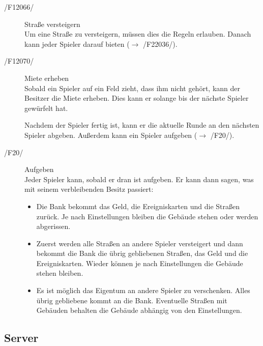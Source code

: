 \documentclass[a4paper,10pt]{article}
\begin{document}
\begin{description}
\item[/F12066/] Straße versteigern \\
Um eine Straße zu versteigern, müssen dies die Regeln erlauben. Danach kann jeder Spieler darauf bieten ($\rightarrow$ /F22036/).
\item[/F12070/] Miete erheben \\
Sobald ein Spieler auf ein Feld zieht, dass ihm nicht gehört, kann der Besitzer die Miete erheben. Dies kann er solange bis der nächste Spieler gewürfelt hat.

Nachdem der Spieler fertig ist, kann er die aktuelle Runde an den nächsten Spieler abgeben. Außerdem kann ein Spieler aufgeben ($\rightarrow$ /F20/).
\item[/F20/] Aufgeben \\
Jeder Spieler kann, sobald er dran ist aufgeben. Er kann dann sagen, was mit seinem verbleibenden Besitz passiert:
\begin{itemize}
\item Die Bank bekommt das Geld, die Ereigniskarten und die Straßen zurück. Je nach Einstellungen bleiben die Gebäude stehen oder werden abgerissen.
\item Zuerst werden alle Straßen an andere Spieler versteigert und dann bekommt die Bank die übrig gebliebenen Straßen, das Geld und die Ereigniskarten. Wieder können je nach Einstellungen die Gebäude stehen bleiben.
\item Es ist möglich das Eigentum an andere Spieler zu verschenken. Alles übrig gebliebene kommt an die Bank. Eventuelle Straßen mit Gebäuden behalten die Gebäude abhängig von den Einstellungen.
\end{itemize}
\end{description}

\subsection{Server}
\end{document}
